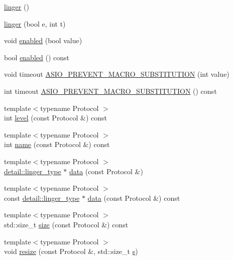 \begin{DoxyCompactItemize}
\item 
\hyperlink{classasio_1_1detail_1_1socket__option_1_1linger_a3ba41e1cb8fdaac33e80cee84dd8992a}{linger} ()
\item 
\hyperlink{classasio_1_1detail_1_1socket__option_1_1linger_a088aedf18b1829ac36b1d2c3c3dcb493}{linger} (bool e, int t)
\item 
void \hyperlink{classasio_1_1detail_1_1socket__option_1_1linger_abaae7be14cced58cde693ae252896d16}{enabled} (bool value)
\item 
bool \hyperlink{classasio_1_1detail_1_1socket__option_1_1linger_ae9f37998d2960fc7eee0e1c07c6de3ee}{enabled} () const 
\item 
void timeout \hyperlink{classasio_1_1detail_1_1socket__option_1_1linger_abfde048b1b715dc6d8b4ee4793d0e0dd}{A\+S\+I\+O\+\_\+\+P\+R\+E\+V\+E\+N\+T\+\_\+\+M\+A\+C\+R\+O\+\_\+\+S\+U\+B\+S\+T\+I\+T\+U\+T\+I\+O\+N} (int value)
\item 
int timeout \hyperlink{classasio_1_1detail_1_1socket__option_1_1linger_a6b2e4f1a0ed83dab648e1d47544ebdac}{A\+S\+I\+O\+\_\+\+P\+R\+E\+V\+E\+N\+T\+\_\+\+M\+A\+C\+R\+O\+\_\+\+S\+U\+B\+S\+T\+I\+T\+U\+T\+I\+O\+N} () const 
\item 
{\footnotesize template$<$typename Protocol $>$ }\\int \hyperlink{classasio_1_1detail_1_1socket__option_1_1linger_a198b756adbf617b542462516a63df814}{level} (const Protocol \&) const 
\item 
{\footnotesize template$<$typename Protocol $>$ }\\int \hyperlink{classasio_1_1detail_1_1socket__option_1_1linger_a79bf1bc1d3e1cf2229550f64cbf6d2d3}{name} (const Protocol \&) const 
\item 
{\footnotesize template$<$typename Protocol $>$ }\\\hyperlink{namespaceasio_1_1detail_a417cb909eef0654a2e53adc1f4dd2dc1}{detail\+::linger\+\_\+type} $\ast$ \hyperlink{classasio_1_1detail_1_1socket__option_1_1linger_a89a904b9b46745951391956d563721f6}{data} (const Protocol \&)
\item 
{\footnotesize template$<$typename Protocol $>$ }\\const \hyperlink{namespaceasio_1_1detail_a417cb909eef0654a2e53adc1f4dd2dc1}{detail\+::linger\+\_\+type} $\ast$ \hyperlink{classasio_1_1detail_1_1socket__option_1_1linger_afb8f8f39249262fe3e1f9ddc9f62f2e4}{data} (const Protocol \&) const 
\item 
{\footnotesize template$<$typename Protocol $>$ }\\std\+::size\+\_\+t \hyperlink{classasio_1_1detail_1_1socket__option_1_1linger_af625a09cf1f390654b2d4ef98014dbf8}{size} (const Protocol \&) const 
\item 
{\footnotesize template$<$typename Protocol $>$ }\\void \hyperlink{classasio_1_1detail_1_1socket__option_1_1linger_a2eb07ca2b3257d1460fdcf5d0e126647}{resize} (const Protocol \&, std\+::size\+\_\+t \hyperlink{group__async__connect_ga31ab74b9ea6c77932dddd016cfc7920a}{s})
\end{DoxyCompactItemize}



